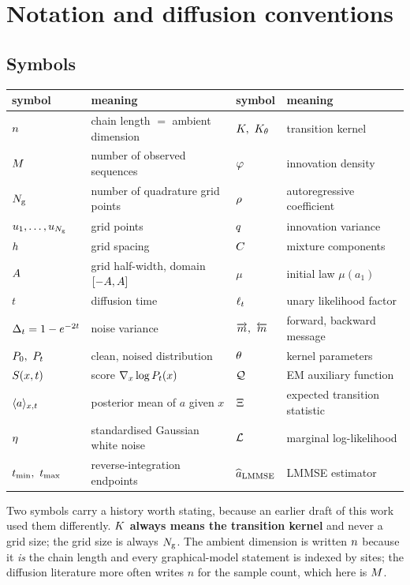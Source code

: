 \section{Notation and diffusion conventions}
\label{app:notation}

\subsection{Symbols}

\begin{center}
\small
\begin{tabular}{ll@{\qquad}ll}
\toprule
symbol & meaning & symbol & meaning \\
\midrule
$n$ & chain length $=$ ambient dimension & $\kernel,\ \kernelth$ & transition kernel \\
$M$ & number of observed sequences & $\varphi$ & innovation density \\
$N_{\mathrm{g}}$ & number of quadrature grid points & $\rho$ & autoregressive coefficient \\
$u_{1},\dots,u_{N_{\mathrm{g}}}$ & grid points & $q$ & innovation variance \\
$h$ & grid spacing & $C$ & mixture components \\
$A$ & grid half-width, domain $[-A,A]$ & $\mu$ & initial law $\mu(a_1)$ \\
$t$ & diffusion time & $\ell_t$ & unary likelihood factor \\
$\Delta_t = 1-e^{-2t}$ & noise variance & $\lmsg,\ \rmsg$ & forward, backward message \\
$\Pz,\ \Pt$ & clean, noised distribution & $\theta$ & kernel parameters \\
$S(x,t)$ & score $\nabla_x\log P_t(x)$ & $\mathcal{Q}$ & EM auxiliary function \\
$\langle a \rangle_{x,t}$ & posterior mean of $a$ given $x$ & $\Xi$ & expected transition statistic \\
$\eta$ & standardised Gaussian white noise & $\mathcal{L}$ & marginal log-likelihood \\
$\tmin,\ \tmax$ & reverse-integration endpoints & $\widehat{a}_{\mathrm{LMMSE}}$ & LMMSE estimator \\
\bottomrule
\end{tabular}
\end{center}

Two symbols carry a history worth stating, because an earlier draft of this work used them
differently. \textbf{$K$ always means the transition kernel} and never a grid size; the
grid size is always $N_{\mathrm{g}}$. The ambient dimension is written $n$ because it \emph{is} the
chain length and every graphical-model statement is indexed by sites; the diffusion literature
more often writes $n$ for the sample count, which here is $M$.

